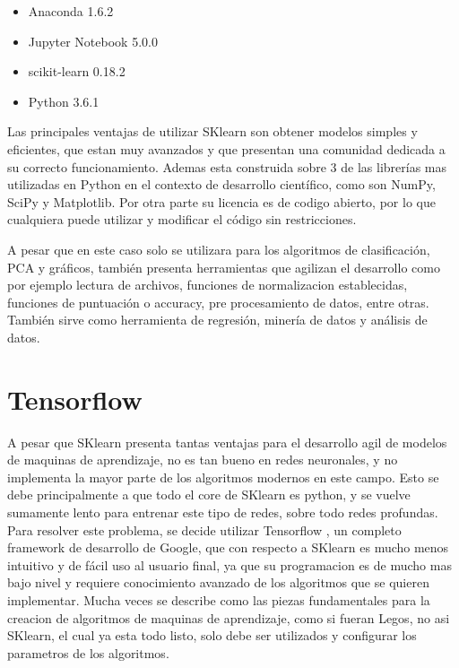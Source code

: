 \begin{itemize}
\item Anaconda 1.6.2
\item Jupyter Notebook 5.0.0
\item scikit-learn 0.18.2
\item Python 3.6.1
\end{itemize}

Las principales ventajas de utilizar SKlearn son obtener modelos simples y eficientes, que estan muy avanzados y que presentan una comunidad dedicada a su correcto funcionamiento. Ademas esta construida sobre 3 de las librerías mas utilizadas en Python en el contexto de desarrollo científico, como son NumPy, SciPy y Matplotlib. Por otra parte su licencia es de codigo abierto, por lo que cualquiera puede utilizar y modificar el código sin restricciones.

A pesar que en este caso solo se utilizara para los algoritmos de clasificación, PCA y gráficos, también presenta herramientas que agilizan el desarrollo como por ejemplo lectura de archivos, funciones de normalizacion establecidas, funciones de puntuación o accuracy, pre procesamiento de datos, entre otras. También sirve como herramienta de regresión, minería de datos y análisis de datos.

\section{ Tensorflow}

A pesar que SKlearn presenta tantas ventajas para el desarrollo agil de modelos de maquinas de aprendizaje, no es tan bueno en redes neuronales, y no implementa la mayor parte de los algoritmos modernos en este campo. Esto se debe principalmente a que todo el core de SKlearn es python, y se vuelve sumamente lento para entrenar este tipo de redes, sobre todo redes profundas. Para resolver este problema, se decide utilizar Tensorflow \cite{tensorflow2015-whitepaper}, un completo framework de desarrollo de Google, que con respecto a SKlearn es mucho menos intuitivo y de fácil uso al usuario final, ya que su programacion es de mucho mas bajo nivel y requiere conocimiento avanzado de los algoritmos que se quieren implementar.  Mucha veces se describe como las piezas fundamentales para la creacion de algoritmos de maquinas de aprendizaje, como si fueran Legos, no asi SKlearn, el cual ya esta todo listo, solo debe ser utilizados y configurar los parametros de los algoritmos.

